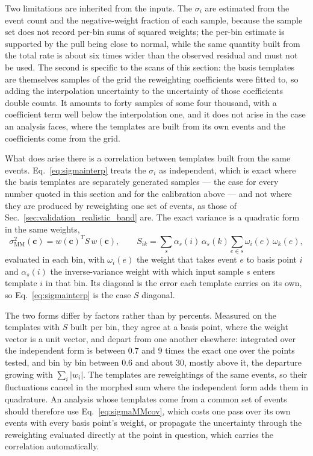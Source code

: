 Two limitations are inherited from the inputs. The $\sigma_i$ are estimated from the
event count and the negative-weight fraction of each sample, because the sample set does
not record per-bin sums of squared weights; the per-bin estimate is supported by the
pull being close to normal, while the same quantity built from the total rate is about
six times wider than the observed residual and must not be used. The second is specific
to the scans of this section: the basis templates are themselves samples of the grid the
reweighting coefficients were fitted to, so adding the interpolation uncertainty to the
uncertainty of those coefficients double counts. It amounts to forty samples of some
four thousand, with a coefficient term well below the interpolation one, and it does not
arise in the case an analysis faces, where the templates are built from its own events
and the coefficients come from the grid.

What does arise there is a correlation between templates built from the same events.
Eq.~\eqref{eq:sigmainterp} treats the $\sigma_i$ as independent, which is exact where
the basis templates are separately generated samples --- the case for every number
quoted in this section and for the calibration above --- and not where they are produced
by reweighting one set of events, as those of
Sec.~\ref{sec:validation_realistic_band} are. The exact variance is a quadratic form in
the same weights,
\begin{equation}
  \sigma^2_\mathrm{MM}(\mathbf{c}) = w(\mathbf{c})^{T} S\, w(\mathbf{c}),
  \qquad
  S_{ik} = \sum_s \alpha_s(i)\,\alpha_s(k) \sum_{e \in s} \omega_i(e)\,\omega_k(e),
  \label{eq:sigmaMMcov}
\end{equation}
evaluated in each bin, with $\omega_i(e)$ the weight that takes event $e$ to basis point
$i$ and $\alpha_s(i)$ the inverse-variance weight with which input sample $s$ enters
template $i$ in that bin. Its diagonal is the error each template carries on its own, so
Eq.~\eqref{eq:sigmainterp} is the case $S$ diagonal.

The two forms differ by factors rather than by percents. Measured on the \HHbbbb templates with
$S$ built per \mHH bin, they agree at a basis point, where the weight vector is a unit
vector, and depart from one another elsewhere: integrated over \mHH the independent form
is between $0.7$ and $9$ times the exact one over the points tested, and bin by bin
between $0.6$ and about $30$, mostly above it, the departure growing with
$\sum_i|w_i|$. The templates are reweightings of the same events, so their fluctuations
cancel in the morphed sum where the independent form adds them in quadrature. An
analysis whose templates come from a common set of events should therefore use
Eq.~\eqref{eq:sigmaMMcov}, which costs one pass over its own events with every basis
point's weight, or propagate the uncertainty through the reweighting evaluated directly
at the point in question, which carries the correlation automatically.

